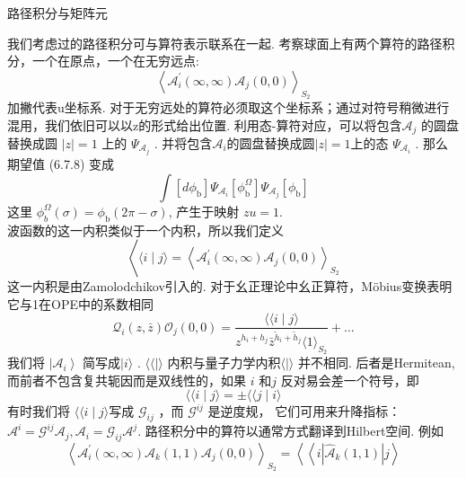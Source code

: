 \centerline{\Large 路径积分与矩阵元}
我们考虑过的路径积分可与算符表示联系在一起. 考察球面上有两个算符的路径积分，一个在原点，一个在无穷远点:
\begin{equation}
	\left\langle\mathscr{A}_{i}^{\prime}(\infty, \infty) \mathscr{A}_{j}(0,0)\right\rangle_{S_{2}}
\end{equation}
加撇代表u坐标系. 对于无穷远处的算符必须取这个坐标系；通过对符号稍微进行混用，我们依旧可以以z的形式给出位置. 利用态-算符对应，可以将包含$\mathscr{A}_{j}$ 的圆盘替换成圆 $|z|=1$ 上的 $\Psi_{\mathscr{A}_{j}}$  . 并将包含$\mathscr{A}_{i}$的圆盘替换成圆$|z|=1 $上的态 $\Psi_{\mathscr{A}_{i}}$ . 那么期望值 (6.7.8) 变成
\begin{equation}
	\int\left[d \phi_{\mathrm{b}}\right] \Psi_{\mathscr{A}_{i}}\left[\phi_{\mathrm{b}}^{\Omega}\right] \Psi_{\mathscr{A}_{j}}\left[\phi_{\mathrm{b}}\right]
\end{equation}
这里 $\phi_{b}^{\Omega}(\sigma)=\phi_{\mathrm{b}}(2 \pi-\sigma)$, 产生于映射 $z u=1$.\\
波函数的这一内积类似于一个内积，所以我们定义
\begin{equation}
	\left\langle\langle i \mid j\rangle=\left\langle\mathscr{A}_{i}^{\prime}(\infty, \infty) \mathscr{A}_{j}(0,0)\right\rangle_{S_{2}}\right.
\end{equation}
这一内积是由Zamolodchikov引入的. 对于幺正理论中幺正算符，Möbius变换表明它与1在OPE中的系数相同
\begin{equation}
	\mathcal{Q}_{i}(z, \bar{z}) \mathcal{O}_{j}(0,0)=\frac{\langle\langle i \mid j\rangle}{z^{h_{i}+h_{j}} \bar{z}^{\tilde{h}_{i}+\tilde{h}_{j}}\langle 1\rangle_{S_{2}}}+\ldots
\end{equation}
我们将 $\left|\mathscr{A}_{i}\right\rangle$ 简写成$|i\rangle $ .  $\langle\langle | \rangle$ 内积与量子力学内积$\langle |\rangle$ 并不相同. 后者是Hermitean,而前者不包含复共轭因而是双线性的，如果 $i$ 和$j$ 反对易会差一个符号，即
\begin{equation}
	\langle\langle i \mid j\rangle=\pm\langle\langle j \mid i\rangle
\end{equation}
有时我们将 $\langle\langle i \mid j\rangle$写成 $\mathscr{G}_{i j}$ ，而 $\mathscr{G}^{i j}$ 是逆度规， 它们可用来升降指标： $\mathscr{A}^{i}=\mathscr{G}^{i j} \mathscr{A}_{j}, \mathscr{A}_{i}=\mathscr{G}_{i j} \mathscr{A}^{j}$.
路径积分中的算符以通常方式翻译到Hilbert空间. 例如
\begin{equation}
	\left\langle\mathscr{A}_{i}^{\prime}(\infty, \infty) \mathscr{A}_{k}(1,1) \mathscr{A}_{j}(0,0)\right\rangle_{S_{2}}=\left\langle\left\langle i\left|\hat{\mathscr{A}}_{k}(1,1)\right| j\right\rangle\right.
\end{equation}
